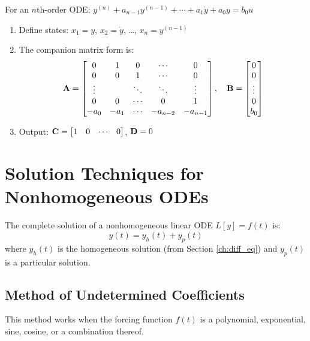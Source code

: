 \begin{keyconceptbox}[title=State-Space Conversion Recipe]
For an $n$th-order ODE: $y^{(n)} + a_{n-1}y^{(n-1)} + \cdots + a_1\dot{y} + a_0 y = b_0 u$
\begin{enumerate}
    \item Define states: $x_1 = y$, $x_2 = \dot{y}$, \ldots, $x_n = y^{(n-1)}$
    \item The companion matrix form is:
    \begin{equation}
    \mathbf{A} = \begin{bmatrix} 0 & 1 & 0 & \cdots & 0 \\ 0 & 0 & 1 & \cdots & 0 \\ \vdots & & \ddots & \ddots & \vdots \\ 0 & 0 & \cdots & 0 & 1 \\ -a_0 & -a_1 & \cdots & -a_{n-2} & -a_{n-1} \end{bmatrix}, \quad
    \mathbf{B} = \begin{bmatrix} 0 \\ 0 \\ \vdots \\ 0 \\ b_0 \end{bmatrix}
    \end{equation}
    \item Output: $\mathbf{C} = \begin{bmatrix} 1 & 0 & \cdots & 0 \end{bmatrix}$, $\mathbf{D} = 0$
\end{enumerate}
\end{keyconceptbox}

\section{Solution Techniques for Nonhomogeneous ODEs}
\label{sec:solution_techniques}

The complete solution of a nonhomogeneous linear ODE $L[y] = f(t)$ is:
\begin{equation}
y(t) = y_h(t) + y_p(t)
\end{equation}
where $y_h(t)$ is the homogeneous solution (from Section \ref{ch:diff_eq}) and $y_p(t)$ is a particular solution.

\subsection{Method of Undetermined Coefficients}

This method works when the forcing function $f(t)$ is a polynomial, exponential, sine, cosine, or a combination thereof.

